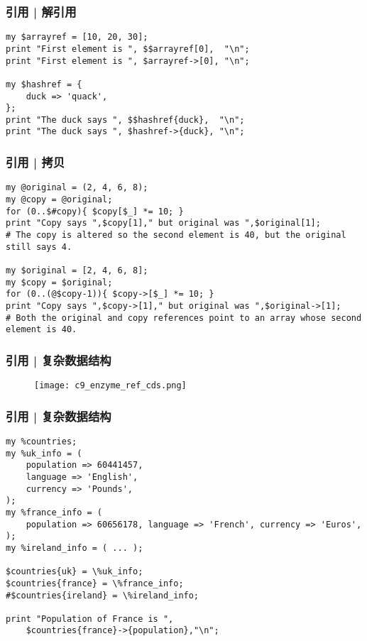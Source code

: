 \begin{frame}[fragile]
  \frametitle{引用 | 解引用}
  \vspace{-1.5em}
\begin{lstlisting}
my $arrayref = [10, 20, 30];
print "First element is ", $$arrayref[0],  "\n";
print "First element is ", $arrayref->[0], "\n";

my $hashref = {
    duck => 'quack',
};
print "The duck says ", $$hashref{duck},  "\n";
print "The duck says ", $hashref->{duck}, "\n";
\end{lstlisting}
\end{frame}

\begin{frame}[fragile]
  \frametitle{引用 | 拷贝}
  \vspace{-1.5em}
\begin{lstlisting}
my @original = (2, 4, 6, 8);
my @copy = @original;
for (0..$#copy){ $copy[$_] *= 10; }
print "Copy says ",$copy[1]," but original was ",$original[1];
# The copy is altered so the second element is 40, but the original still says 4.

my $original = [2, 4, 6, 8];
my $copy = $original;
for (0..(@$copy-1)){ $copy->[$_] *= 10; }
print "Copy says ",$copy->[1]," but original was ",$original->[1];
# Both the original and copy references point to an array whose second element is 40.
\end{lstlisting}
\end{frame}

\begin{frame}
  \frametitle{引用 | 复杂数据结构}
  \begin{figure}
    \centering
    \texttt{[image: c9\_enzyme\_ref\_cds.png]}
  \end{figure}
\end{frame}

\begin{frame}[fragile]
  \frametitle{引用 | 复杂数据结构}
  \vspace{-1.5em}
\begin{lstlisting}[basicstyle=\small\tt]
my %countries;
my %uk_info = (
    population => 60441457,
    language => 'English',
    currency => 'Pounds',
);
my %france_info = (
    population => 60656178, language => 'French', currency => 'Euros',
);
my %ireland_info = ( ... );

$countries{uk} = \%uk_info;
$countries{france} = \%france_info;
#$countries{ireland} = \%ireland_info;

print "Population of France is ",
    $countries{france}->{population},"\n";
\end{lstlisting}
\end{frame}

